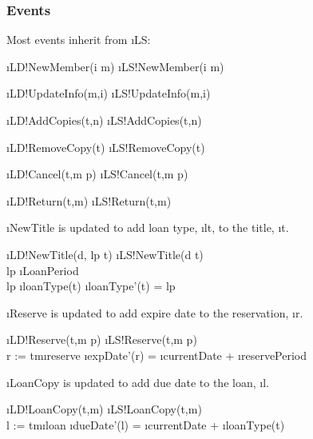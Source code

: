 \documentclass[12pt,a4paper]{article}
\begin{document}
\newpage
\subsubsection*{Events}

\noindent Most events inherit from \i{LS}:
\begin{showspecs}
	\begin{spec}{\i{LD!NewMember(i \to m)}}
		\i{LS!NewMember(i \to m)}
	\end{spec}
	\showbeside
	\begin{spec}{\i{LD!UpdateInfo(m,i)}}
		\i{LS!UpdateInfo(m,i)}
	\end{spec}
	\showmore
	\begin{spec}{\i{LD!AddCopies(t,n)}}	
		\i{LS!AddCopies(t,n)}
	\end{spec}
	\showbeside
	\begin{spec}{\i{LD!RemoveCopy(t)}}	
		\i{LS!RemoveCopy(t)}
	\end{spec}
    \showmore
    \begin{spec}{\i{LD!Cancel(t,m \to p)}}
        \i{LS!Cancel(t,m \to p)}
    \end{spec}
    \showbeside
    \begin{spec}{\i{LD!Return(t,m)}}
        \i{LS!Return(t,m)}
    \end{spec}
\end{showspecs}

\bigskip\noindent \i{NewTitle} is updated to add loan type, \i{lt}, to the title, \i{t}.
\begin{showspecs}
    \begin{spec}{\i{LD!NewTitle(d, lp \to t)}}
		\i{LS!NewTitle(d \to t)}\\
        lp \in \i{LoanPeriod}\\
        lp \ne \i{loanType(t)}
        \post
        \i{loanType'(t)} = lp
	\end{spec}
\end{showspecs}

\bigskip\noindent \i{Reserve} is updated to add expire date to the reservation, \i{r}.
\begin{showspecs}
	\begin{spec}{\i{LD!Reserve(t,m \to p)}}
		\i{LS!Reserve(t,m \to p)}\\
        r := t\mapsto m\in \i{reserve}
        \post
        \i{expDate'(r)} = \i{currentDate} + \i{reservePeriod}
	\end{spec}
\end{showspecs}

\bigskip\noindent \i{LoanCopy} is updated to add due date to the loan, \i{l}.
\begin{showspecs}
	\begin{spec}{\i{LD!LoanCopy(t,m)}}
		\i{LS!LoanCopy(t,m)}\\
        l := t\mapsto m\in \i{loan}
        \post
        \i{dueDate'(l)} = \i{currentDate} + \i{loanType(t)}
	\end{spec}
\end{showspecs}
\end{document}
